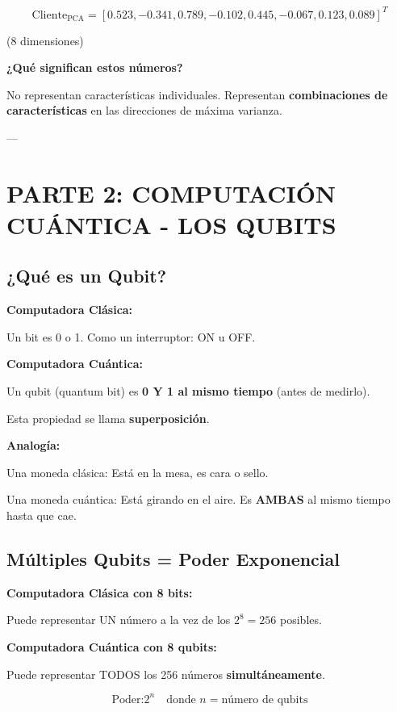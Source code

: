 \documentclass[11pt,a4paper,spanish]{article}
\begin{document}
\[
\text{Cliente}_{\text{PCA}} = [0.523, -0.341, 0.789, -0.102, 0.445, -0.067, 0.123, 0.089]^T
\]

(8 dimensiones)

\textbf{¿Qué significan estos números?}

No representan características individuales. Representan \textbf{combinaciones de características} en las direcciones de máxima varianza.

---

\section{PARTE 2: COMPUTACIÓN CUÁNTICA - LOS QUBITS}

\subsection{¿Qué es un Qubit?}

\textbf{Computadora Clásica:}

Un bit es 0 o 1. Como un interruptor: ON u OFF.

\textbf{Computadora Cuántica:}

Un qubit (quantum bit) es \textbf{0 Y 1 al mismo tiempo} (antes de medirlo).

Esta propiedad se llama \textbf{superposición}.

\textbf{Analogía:}

Una moneda clásica: Está en la mesa, es cara o sello.

Una moneda cuántica: Está girando en el aire. Es \textbf{AMBAS} al mismo tiempo hasta que cae.

\subsection{Múltiples Qubits = Poder Exponencial}

\textbf{Computadora Clásica con 8 bits:}

Puede representar UN número a la vez de los $2^8 = 256$ posibles.

\textbf{Computadora Cuántica con 8 qubits:}

Puede representar TODOS los 256 números \textbf{simultáneamente}.

\[
\text{Poder:} 2^n \quad \text{donde } n = \text{número de qubits}
\]
\end{document}
